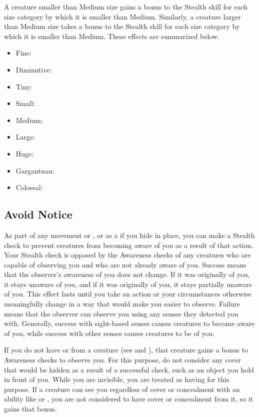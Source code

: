         \label{Size and Stealth} A creature smaller than Medium size gains a  bonus to the Stealth skill for each size category by which it is smaller than Medium.
        Similarly, a creature larger than Medium size takes a  bonus to the Stealth skill for each size category by which it is smaller than Medium.
        These effects are summarized below.
            \begin{itemize}
                \item Fine: 
                \item Diminutive: 
                \item Tiny: 
                \item Small: 
                \item Medium: 
                \item Large: 
                \item Huge: 
                \item Gargantuan: 
                \item Colossal: 
            \end{itemize}

    \subsection{Avoid Notice}
        As part of any movement or , or as a  if you hide in place, you can make a Stealth check to prevent creatures from becoming aware of you as a result of that action.
        Your Stealth check is opposed by the Awareness checks of any creatures who are capable of observing you and who are not already aware of you.
        Success means that the observer's awareness of you does not change.
        If it was originally \unaware of you, it stays unaware of you, and if it was originally \partiallyunaware of you, it stays partially unaware of you.
        This effect lasts until you take an action or your circumstances otherwise meaningfully change in a way that would make you easier to observe.
        Failure means that the observer can observe you using any senses they detected you with.
        Generally, success with sight-based senses causes creatures to become aware of you, while success with other senses causes creatures to be \partiallyunaware of you.

        If you do not have  or  from a creature (see  and ), that creature gains a  bonus to Awareness checks to observe you.
        For this purpose, do not consider any cover that would be hidden as a result of a successful check, such as an object you hold in front of you.
        While you are invisible, you are treated as having  for this purpose.
        If a creature can see you regardless of cover or concealment with an ability like  or , you are not considered to have cover or concealment from it, so it gains that  bonus.

